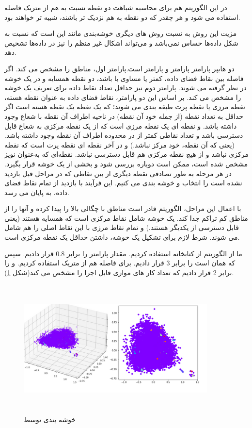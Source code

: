 \documentclass[12pt,onecolumn,a4paper]{article}
\begin{document}
در این الگوریتم هم برای محاسبه شباهت دو نقطه نسبت به هم از متریک فاصله استفاده می شود و هر چقدر که دو نقطه به هم نزدیک تر باشند، شبیه تر خواهند بود.

مزیت این روش به نسبت روش‌ های دیگری خوشه‌بندی مانند  این است که نسبت به شکل داده‌ها حساس نمی‌باشد و می‌تواند اشکال غیر منظم را نیز در داده‌ها تشخیص دهد.

دو هایپر پارامتر  پارامتر  و پارامتر  است.پارامتر اول، مناطق را مشخص می کند. اگر فاصله بین نقاط فضای داده، کمتر یا مساوی با  باشد، دو نقطه همسایه و در یک خوشه در نظر گرفته می شوند. پارامتر دوم نیز حداقل تعداد نقاط داده برای تعریف یک خوشه را مشخص می کند. بر اساس این دو پارامتر، نقاط فضای داده به عنوان نقطه هسته، نقطه مرزی یا نقطه پرت طبقه بندی می شوند؛ که یک نقطه یک نقطه هسته است اگر حداقل به تعداد  نقطه (از جمله خود آن نقطه) در ناحیه اطراف آن نقطه با شعاع  وجود داشته باشد. و نقطه ای یک نقطه مرزی است که از یک نقطه مرکزی به شعاع  قابل دسترسی باشد و تعداد نقاطی کمتر از  در محدوده اطراف آن نقطه وجود داشته باشد. (یعنی که آن نقطه، خود مرکز نباشد.) و در آخر نقطه ای نقطه پرت است که نقطه مرکزی نباشد و از هیچ نقطه مرکزی هم قابل دسترسی نباشد. نقطه‌ای که به‌عنوان نویز مشخص شده است، ممکن است دوباره بررسی شود و بخشی از یک خوشه قرار بگیرد. در هر مرحله به طور تصادفی نقطه دیگری از بین نقاطی که در مراحل قبل بازدید نشده است را انتخاب و خوشه بندی می کنیم. این فرآیند با بازدید از تمام نقاط فضای داده، به پایان می رسد.

با اعمال این مراحل، الگوریتم  قادر است مناطق با چگالی بالا را پیدا کرده و آنها را از مناطق کم تراکم جدا کند. یک خوشه شامل نقاط مرکزی است که همسایه هستند (یعنی قابل دسترسی از یکدیگر هستند.) و تمام نقاط مرزی با این نقاط اصلی را هم شامل می شوند. شرط لازم برای تشکیل یک خوشه، داشتن حداقل یک نقطه مرکزی است.

ما از الگوریتم  از کتابخانه  استفاده کردیم. مقدار پارامتر  را برابر 0.8 قرار دادیم. سپس  که همان  است را برابر 3 قرار دادیم. برای فاصله هم از متریک  استفاده کردیم. و  را برابر 2 قرار دادیم که تعداد کار های موازی قابل اجرا را مشخص می کند(شکل \ref{fig:DBSCAN}).

\begin{figure}
  \centering
  \includegraphics[width=10cm,height=7cm,keepaspectratio]{20.png}
  \caption{خوشه بندی توسط }
  \label{fig:DBSCAN}
\end{figure}
\end{document}
